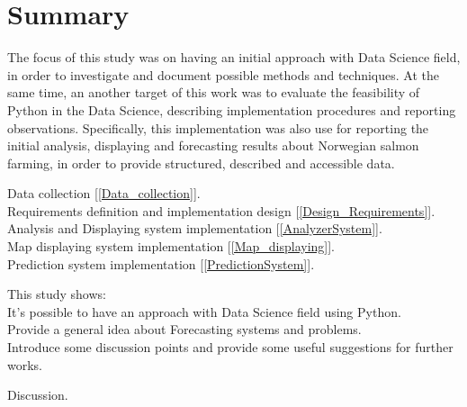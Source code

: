 
\section{Summary}

The focus of this study was on having an initial approach with Data Science field, in order to investigate and document possible methods and techniques. At the same time, an another target of this work was to evaluate the feasibility of Python in the Data Science, describing implementation procedures and reporting observations. Specifically, this implementation was also use for reporting the initial analysis, displaying and forecasting results about Norwegian salmon farming, in order to provide structured, described and accessible data.

Data collection [\ref{Data_collection}]. \\
Requirements definition and implementation design [\ref{Design_Requirements}].\\
Analysis and Displaying system implementation [\ref{AnalyzerSystem}]. \\
Map displaying system implementation [\ref{Map_displaying}]. \\
Prediction system implementation [\ref{PredictionSystem}].

This study shows: \\
It's possible to have an approach with Data Science field using Python. \\
Provide a general idea about Forecasting systems and problems. \\
Introduce some discussion points and provide some useful suggestions for further works.

Discussion.




















\newpage
